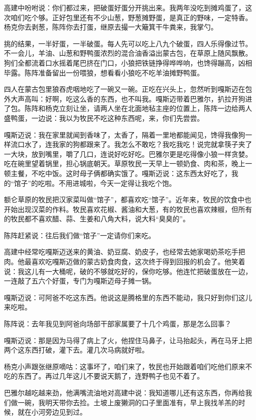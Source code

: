 \par 高建中吩咐说：你们都过来，把破蛋好蛋分开挑出来。我两年没吃到摊鸡蛋了，这次咱们吃个够。正好包里还有不少山葱，野葱摊野蛋，是真正的野味，一定特香。杨克你去剥葱，陈阵你去打蛋，继原去撮一大簸箕干牛粪来，我掌勺。
\par 挑的结果，一半好蛋，一半破蛋。每人先可以吃上八九个破蛋，四人乐得像过节。不一会儿，羊油、山葱和野鸭蛋浓烈的混合油香溢出蒙古包，在草原上随风飘散。狗们全都流着口水摇着尾巴挤在门口，小狼把铁链挣得哗哗响，也馋得蹦高，凶相毕露。陈阵准备留出一份喂狼，想看看小狼吃不吃羊油摊野鸭蛋。
\par 四人在蒙古包里狼吞虎咽地吃了一碗又一碗。正吃在兴头上，忽然听到嘎斯迈在包外大声高叫：好啊，吃这么香的东西，也不叫我。嘎斯迈带着巴雅尔，扒拉开狗进了包。陈阵和杨克立刻让坐，请两人坐在北面地毡主座的位置上，陈阵一边给两人盛鸭蛋，一边说：我以为牧民不吃这种东西呢，来，你们先尝尝。
\par 嘎斯迈说：我在家里就闻到香味了，太香了，隔着一里地都能闻见，馋得我像狗一样流口水了，连我家的狗都跟来了。我怎么不敢吃？我吃我吃！说完就拿筷子夹了一大块，放到嘴里，嚼了几口，连说好吃好吃。巴雅尔更是吃得像小狼一样贪婪。吃在碗里望着锅里，担心锅底朝天。草原牧民一天早上一顿奶食、肉和茶，晚上一顿主餐，不吃中饭。这时母子俩都确实饿了。嘎斯迈说：这东西太好吃了，我的“馆子”的吃啦。不用进城啦，今天一定得让我吃个饱。
\par 额仑草原的牧民把汉家菜叫做“馆子”，都喜欢吃“馆子”。近年来，牧民的饮食中也开始出现汉菜的作料。牧民喜欢花椒、酱油和大葱，有的牧民也喜欢辣椒，但所有的牧民都不喜欢醋、蒜、生姜和八角大料，说大料“臭臭的”。
\par 陈阵赶紧说：往后我们做“馆子”一定请你们来吃。
\par 高建中经常吃嘎斯迈送来的黄油、奶豆腐、奶皮子，也经常去她家喝奶茶吃手把肉。他最喜欢吃嘎斯迈做的蒙古奶食肉食，这次终于得到回报的机会了。他笑着说：我这儿有一大桶呢，破的不够就吃好的，保你吃够。他连忙把破蛋放在一边，一连敲了五六个好蛋，专门为嘎斯迈母子摊一锅。
\par 嘎斯迈说：可阿爸不吃这东西。他说这是腾格里的东西不能动，我只好到你们这儿来吃啦。
\par 陈阵说：去年我见到阿爸向场部干部家属要了十几个鸡蛋，那是怎么回事？
\par 嘎斯迈说：那是因为马得了病上了火，他捏住马鼻子，让马抬起头，再在马牙上把两个这东西打破，灌下去。灌几次马病就好啦。
\par 杨克小声跟张继原嘀咕：这事坏了，咱们来了，牧民也开始跟着咱们吃他们原来不吃的东西了。再过几年这儿不要说天鹅了，连野鸭子也见不着了。
\par 巴雅尔越吃越来劲，他满嘴流油地对高建中说：我知道哪儿还有这东西，你再给我们做一碗，我明天带你去捡。土坡上废獭洞的口子里面准有，早上我找羊羔的时候，就在小河旁边见到过。
